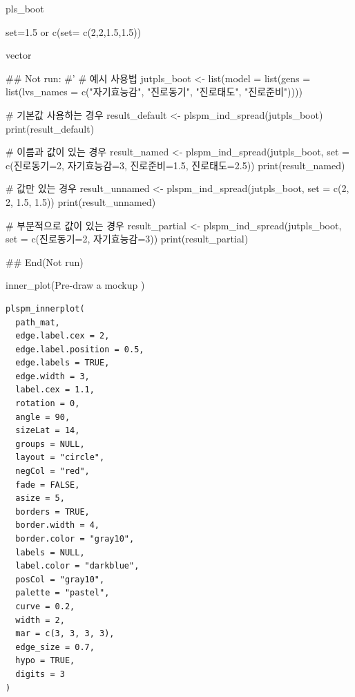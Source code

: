 \documentclass[a4paper]{book}
\begin{document}
%
\begin{Arguments}
\begin{ldescription}
\item[\code{pls\_boot}] pls\_boot

\item[\code{set}] set=1.5 or c(set= c(2,2,1.5,1.5))
\end{ldescription}
\end{Arguments}
%
\begin{Value}
vector
\end{Value}
%
\begin{Examples}
\begin{ExampleCode}

\#\# Not run: 
#'
# 예시 사용법
jutpls_boot <- list(model = list(gens = list(lvs_names = c("자기효능감", "진로동기", "진로태도", "진로준비"))))

# 기본값 사용하는 경우
result_default <- plspm_ind_spread(jutpls_boot)
print(result_default)

# 이름과 값이 있는 경우
result_named <- plspm_ind_spread(jutpls_boot, set = c(진로동기=2, 자기효능감=3, 진로준비=1.5, 진로태도=2.5))
print(result_named)

# 값만 있는 경우
result_unnamed <- plspm_ind_spread(jutpls_boot, set = c(2, 2, 1.5, 1.5))
print(result_unnamed)

# 부분적으로 값이 있는 경우
result_partial <- plspm_ind_spread(jutpls_boot, set = c(진로동기=2, 자기효능감=3))
print(result_partial)


## End(Not run)



\end{ExampleCode}
\end{Examples}
%
\begin{Description}
inner\_plot(Pre-draw a mockup )
\end{Description}
%
\begin{Usage}
\begin{verbatim}
plspm_innerplot(
  path_mat,
  edge.label.cex = 2,
  edge.label.position = 0.5,
  edge.labels = TRUE,
  edge.width = 3,
  label.cex = 1.1,
  rotation = 0,
  angle = 90,
  sizeLat = 14,
  groups = NULL,
  layout = "circle",
  negCol = "red",
  fade = FALSE,
  asize = 5,
  borders = TRUE,
  border.width = 4,
  border.color = "gray10",
  labels = NULL,
  label.color = "darkblue",
  posCol = "gray10",
  palette = "pastel",
  curve = 0.2,
  width = 2,
  mar = c(3, 3, 3, 3),
  edge_size = 0.7,
  hypo = TRUE,
  digits = 3
)
\end{verbatim}
\end{Usage}
\end{document}
